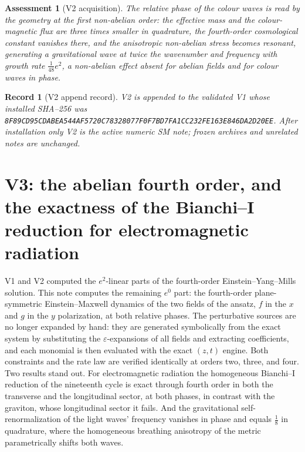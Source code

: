 \documentclass[11pt]{article}
\newtheorem{assessment}[theorem]{Assessment}
\newtheorem{record}[theorem]{Record}
\theoremstyle{remark}
\begin{document}
\begin{assessment}[V2 acquisition]
\label{ass:v20v2}
The relative phase of the colour waves is read by the geometry at the
first non-abelian order: the effective mass and the colour-magnetic
flux are three times smaller in quadrature, the fourth-order
cosmological constant vanishes there, and the anisotropic non-abelian
stress becomes resonant, generating a gravitational wave at twice the
wavenumber and frequency with growth rate \(\tfrac1{48}e^2\), a
non-abelian effect absent for abelian fields and for colour waves in
phase.
\end{assessment}

\begin{record}[V2 append record]
\label{rec:v20v2}
V2 is appended to the validated V1 whose installed SHA--256 was
\texttt{8F89CD95CDABEA544AF5720C78328077F0F7BD7FA1CC232FE163E846DA2D20EE}.
After installation only V2 is the active numeric SM note; frozen
archives and unrelated notes are unchanged.
\end{record}


\section{V3: the abelian fourth order, and the exactness of the Bianchi--I reduction for electromagnetic radiation}
\label{sec:v20v3}

V1 and V2 computed the \(e^2\)-linear parts of the fourth-order
Einstein--Yang--Mills solution.  This note computes the remaining
\(e^0\) part: the fourth-order plane-symmetric Einstein--Maxwell
dynamics of the two fields of the ansatz, \(f\) in the \(x\) and \(g\)
in the \(y\) polarization, at both relative phases.  The perturbative
sources are no longer expanded by hand: they are generated
symbolically from the exact system by substituting the
\(\varepsilon\)-expansions of all fields and extracting coefficients,
and each monomial is then evaluated with the exact \((z,t)\) engine.
Both constraints and the rate law are verified identically at orders
two, three, and four.  Two results stand out.  For electromagnetic
radiation the homogeneous Bianchi--I reduction of the nineteenth cycle
is exact through fourth order in both the transverse and the
longitudinal sector, at both phases, in contrast with the graviton,
whose longitudinal sector it fails.  And the gravitational
self-renormalization of the light waves' frequency vanishes in phase
and equals \(\tfrac18\) in quadrature, where the homogeneous breathing
anisotropy of the metric parametrically shifts both waves.
\end{document}

